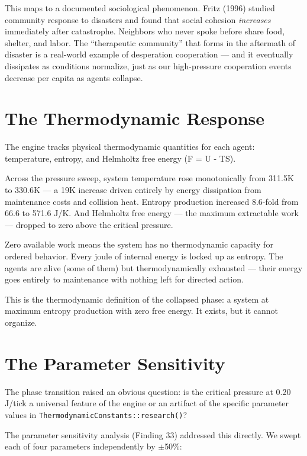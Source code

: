 This maps to a documented sociological phenomenon. Fritz (1996) studied community response to disasters and found that social cohesion \emph{increases} immediately after catastrophe. Neighbors who never spoke before share food, shelter, and labor. The ``therapeutic community'' that forms in the aftermath of disaster is a real-world example of desperation cooperation --- and it eventually dissipates as conditions normalize, just as our high-pressure cooperation events decrease per capita as agents collapse.

\section{The Thermodynamic Response}\label{the-thermodynamic-response}

The engine tracks physical thermodynamic quantities for each agent: temperature, entropy, and Helmholtz free energy (F = U - TS).

Across the pressure sweep, system temperature rose monotonically from 311.5K to 330.6K --- a 19K increase driven entirely by energy dissipation from maintenance costs and collision heat. Entropy production increased 8.6-fold from 66.6 to 571.6 J/K. And Helmholtz free energy --- the maximum extractable work --- dropped to zero above the critical pressure.

Zero available work means the system has no thermodynamic capacity for ordered behavior. Every joule of internal energy is locked up as entropy. The agents are alive (some of them) but thermodynamically exhausted --- their energy goes entirely to maintenance with nothing left for directed action.

This is the thermodynamic definition of the collapsed phase: a system at maximum entropy production with zero free energy. It exists, but it cannot organize.

\section{The Parameter Sensitivity}\label{the-parameter-sensitivity}

The phase transition raised an obvious question: is the critical pressure at 0.20 J/tick a universal feature of the engine or an artifact of the specific parameter values in \texttt{ThermodynamicConstants::research()}?

The parameter sensitivity analysis (Finding 33) addressed this directly. We swept each of four parameters independently by $\pm$50\%:

